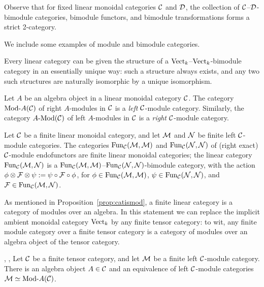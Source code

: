 \documentclass{amsart}
\begin{document}
\nid Observe that for fixed linear monoidal categories $\mathcal C$ and $\mathcal D$, the collection of $\mathcal C$--$\mathcal D$-bimodule categories, bimodule functors, and bimodule transformations forms a strict 2-category.

We include some examples of module and bimodule categories.

\begin{example}
Every linear category can be given the structure of a $\mathrm{Vect}_k$--$\mathrm{Vect}_k$-bimodule category in an essentially unique way: such a structure always exists, and any two such structures are naturally isomorphic by a unique isomorphism.
\end{example} %

\begin{example}
Let $A$ be an algebra object in a linear monoidal category $\mathcal C$.  The category $\Mod{}{A}(\cC)$ of right $A$-modules in $\mathcal C$ is a \emph{left} $\mathcal C$-module category.  Similarly, the category $\Mod{A}{}(\cC)$ of left $A$-modules in $\mathcal C$ is a \emph{right} $\mathcal C$-module category.
\end{example} %

\begin{example}
Let $\mathcal C$ be a finite linear monoidal category, and let $\mathcal M$ and $\mathcal N$ be finite left $\mathcal C$-module categories.  The categories $\operatorname{Fun}_{\mathcal C}(\mathcal M, \mathcal M)$ and $\operatorname{Fun}_{\mathcal C}(\mathcal N, \mathcal N)$ of (right exact) $\mathcal C$-module endofunctors are finite linear monoidal categories; the linear category $\operatorname{Fun}_{\mathcal C}(\mathcal M, \mathcal N)$ is a $\operatorname{Fun}_{\mathcal C}(\mathcal M, \mathcal M)$--$\operatorname{Fun}_{\mathcal C}(\mathcal N, \mathcal N)$-bimodule category, with the action $\phi \otimes \mathcal F \otimes \psi := \psi \circ \mathcal F \circ \phi$, for $\phi \in \operatorname{Fun}_\mathcal C(\mathcal M,\mathcal M)$, $\psi \in \operatorname{Fun}_\mathcal C(\mathcal N,\mathcal N)$, and $\mathcal F \in \operatorname{Fun}_\mathcal C(\mathcal M,\mathcal N)$.
\end{example}

As mentioned in Proposition~\ref{prop:catismod}, a finite linear category is a category of modules over an algebra.  In this statement we can replace the implicit ambient monoidal category $\mathrm{Vect}_k$ by any finite tensor category: to wit, any finite module category over a finite tensor category is a category of modules over an algebra object of the tensor category.

\begin{theorem}{\cite[Thm 2.11.6]{EGNO}, \cite[Thm 1]{MR1976459}, \cite{BTP}} \label{thm:EGNO2.11.6}
Let $\mathcal C$ be a finite tensor category, and let $\mathcal M$ be a finite left $\mathcal C$-module category.  There is an algebra object $A \in \mathcal C$ and an equivalence of left $\mathcal C$-module categories $\cM \simeq \Mod{}{A}(\cC)$.
\end{theorem}
\end{document}
